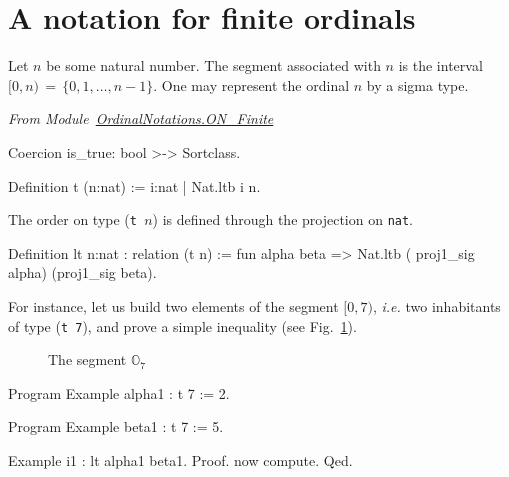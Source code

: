 \documentclass[a4paper]{book}
\begin{document}
\section{A notation for finite ordinals}


Let $n$ be some natural number. The segment associated with $n$ is the interval 
$[0,n)\,=\,\{0,1,\dots,n-1\}$. 
One may represent the ordinal $n$ by a sigma type.


\vspace{4pt}
\noindent\emph{From Module~\href{../src/html/hydras.OrdinalNotations.ON_Finite.html}{OrdinalNotations.ON\_Finite}}

\label{def: Finite-ord-type}
\begin{Coqsrc}
Coercion is_true: bool >-> Sortclass.

Definition t (n:nat) := {i:nat | Nat.ltb i n}.
\end{Coqsrc}

The order on type (\texttt{t $n$}) is defined through the projection on \texttt{nat}.


\begin{Coqsrc}
Definition lt {n:nat} : relation (t n) :=
  fun alpha beta => Nat.ltb ( proj1_sig alpha) (proj1_sig beta).
\end{Coqsrc}

For instance, let us build two elements of the segment $[0, 7)$, \emph{i.e.} two
inhabitants of   type (\texttt{t 7}), and prove a simple  inequality (see Fig.~\ref{fig:O7}).

\begin{figure}[h]
\centering
{}

\caption{The segment $\mathbb{O}_7$\label{fig:O7}}
\end{figure}
  

\begin{Coqsrc}
Program Example alpha1 : t 7 := 2.

Program Example beta1 : t 7 := 5.

Example i1 : lt  alpha1 beta1.
Proof. now compute. Qed.
\end{Coqsrc}
\end{document}
